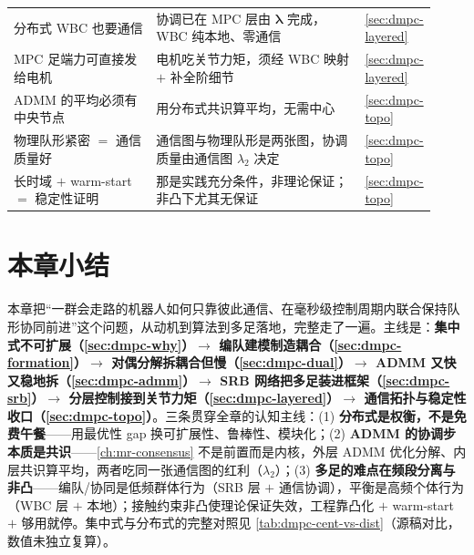 \begin{table}[H]
\begin{tabular}{p{0.34\linewidth}p{0.50\linewidth}p{0.08\linewidth}}
分布式 WBC 也要通信 & 协调已在 MPC 层由 $\boldsymbol{\lambda}$ 完成，WBC 纯本地、零通信 & \cref{sec:dmpc-layered} \\
MPC 足端力可直接发给电机 & 电机吃关节力矩，须经 WBC 映射 $+$ 补全阶细节 & \cref{sec:dmpc-layered} \\
ADMM 的平均必须有中央节点 & 用分布式共识算平均，无需中心 & \cref{sec:dmpc-topo} \\
物理队形紧密 $=$ 通信质量好 & 通信图与物理队形是两张图，协调质量由通信图 $\lambda_2$ 决定 & \cref{sec:dmpc-topo} \\
长时域 $+$ warm-start $=$ 稳定性证明 & 那是实践充分条件，非理论保证；非凸下尤其无保证 & \cref{sec:dmpc-topo} \\
\bottomrule
\end{tabular}
\end{table}

\section*{本章小结}
\label{sec:dmpc-summary}

本章把“一群会走路的机器人如何只靠彼此通信、在毫秒级控制周期内联合保持队形协同前进”这个问题，从动机到算法到多足落地，完整走了一遍。主线是：\textbf{集中式不可扩展（\cref{sec:dmpc-why}）$\to$ 编队建模制造耦合（\cref{sec:dmpc-formation}）$\to$ 对偶分解拆耦合但慢（\cref{sec:dmpc-dual}）$\to$ ADMM 又快又稳地拆（\cref{sec:dmpc-admm}）$\to$ SRB 网络把多足装进框架（\cref{sec:dmpc-srb}）$\to$ 分层控制接到关节力矩（\cref{sec:dmpc-layered}）$\to$ 通信拓扑与稳定性收口（\cref{sec:dmpc-topo}）}。三条贯穿全章的认知主线：(1) \textbf{分布式是权衡，不是免费午餐}——用最优性 gap 换可扩展性、鲁棒性、模块化；(2) \textbf{ADMM 的协调步本质是共识}——\cref{ch:mr-consensus} 不是前置而是内核，外层 ADMM 优化分解、内层共识算平均，两者吃同一张通信图的红利（$\lambda_2$）；(3) \textbf{多足的难点在频段分离与非凸}——编队/协同是低频群体行为（SRB 层 $+$ 通信协调），平衡是高频个体行为（WBC 层 $+$ 本地）；接触约束非凸使理论保证失效，工程靠凸化 $+$ warm-start $+$ 够用就停。集中式与分布式的完整对照见 \cref{tab:dmpc-cent-vs-dist}（源稿对比，数值未独立复算）。

